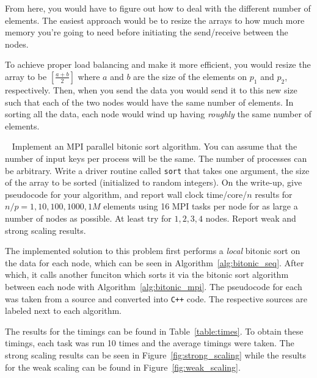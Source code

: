 \documentclass[addpoints]{exam}
\begin{document}
\begin{questions}
\begin{solution}
From here, you would have to figure out how to deal with the different number of elements. The easiest approach would be to resize the arrays to how much more memory you're going to need before initiating the send/receive between the nodes.

To achieve proper load balancing and make it more efficient, you would resize the array to be $\left[\frac{a+b}{2} \right]$ where $a$ and $b$ are the size of the elements on $p_{1}$ and $p_{2}$, respectively. Then, when you send the data you would send it to this new size such that each of the two nodes would have the same number of elements. In sorting all the data, each node would wind up having {\em roughly} the same number of elements.
\end{solution}
\ \newpage
{}
Implement an MPI parallel bitonic sort algorithm. You can assume that the number of input keys per process will be the same. The number of processes can be arbitrary. Write a driver routine called \verb~sort~ that takes one argument, the size of the array to be sorted (initialized to random integers). On the write-up, give pseudocode for your algorithm, and report wall clock time/core/$n$ results for $n/p = 1, 10, 100, 1000, 1M$ elements using 16 MPI tasks per node for as large a number of nodes as possible. At least try for $1,2,3,4$ nodes. Report weak and strong scaling results.

\begin{solution}
The implemented solution to this problem first performs a {\em local} bitonic sort on the data for each node, which can be seen in Algorithm~\ref{alg:bitonic_seq}. After which, it calls another funciton which sorts it via the bitonic sort algorithm between each node with Algorithm~\ref{alg:bitonic_mpi}. The pseudocode for each was taken from a source and converted into {\tt C++} code. The respective sources are labeled next to each algorithm.

The results for the timings can be found in Table~\ref{table:times}. To obtain these timings, each task was run 10 times and the average timings were taken. The strong scaling results can be seen in Figure~\ref{fig:strong_scaling} while the results for the weak scaling can be found in Figure~\ref{fig:weak_scaling}.


\begin{algorithm}[H]
\caption{$BitonicSort(low,high,up,A)$ \cite{bitonic}}
\begin{algorithmic}
\ENDIF
\end{algorithmic}
\label{alg:bitonic_seq}
\end{algorithm}


\end{solution}
\end{questions}
\end{document}
